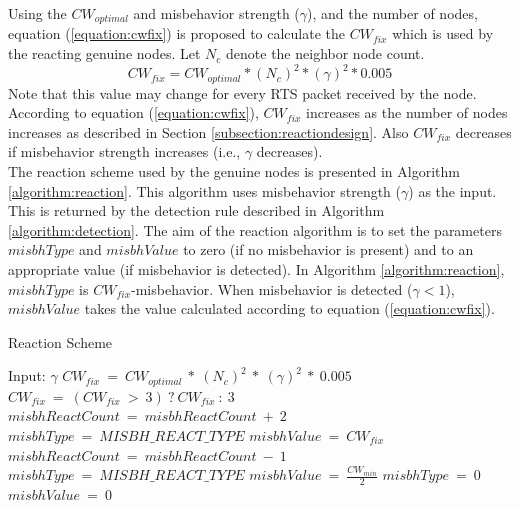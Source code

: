 \documentclass[12pt,letterpaper,english]{article}
\begin{document}
\indent Using the $CW_{optimal}$ and misbehavior strength ($\gamma$), and the number of nodes, equation (\ref{equation:cwfix}) is proposed to calculate the $CW_{fix}$ which is used by the reacting genuine nodes. Let $N_{c}$ denote the neighbor node count.
\begin{equation}
\label{equation:cwfix}
CW_{fix} = CW_{optimal} * (N_{c})^2 * (\gamma)^2 * 0.005
\end{equation}
Note that this value may change for every RTS packet received by the node. According to equation (\ref{equation:cwfix}), $CW_{fix}$ increases as the number of nodes increases as described in Section \ref{subsection:reactiondesign}. Also $CW_{fix}$ decreases if misbehavior strength increases (i.e., $\gamma$ decreases).
\\
\indent The reaction scheme used by the genuine nodes is presented in Algorithm \ref{algorithm:reaction}. This algorithm uses misbehavior strength ($\gamma$) as the input. This is returned by the detection rule described in Algorithm \ref{algorithm:detection}. 
The aim of the reaction algorithm is to set the parameters $misbhType$ and $misbhValue$ to zero (if no misbehavior is present) and to an appropriate value (if misbehavior is detected).
In Algorithm \ref{algorithm:reaction}, $misbhType$ is $CW_{fix}$-misbehavior.
When misbehavior is detected ($\gamma < 1$), $misbhValue$ takes the value calculated according to equation (\ref{equation:cwfix}). 
\begin{algorithm}[t]
\caption{Reaction Scheme}
\label{algorithm:reaction}
\begin{algorithmic}
\STATE Input: $\gamma$
	\STATE $CW_{fix}\ =\ CW_{optimal}\ *\ (N_{c})^2\ *\ (\gamma)^2\ *\ 0.005$
	\STATE $CW_{fix}\ =\ (CW_{fix}\ >\ 3)\ ?\ CW_{fix}\ :\ 3$
	\STATE {}
	\STATE $misbhReactCount\ =\ misbhReactCount\ +\ 2$
	\STATE $misbhType\ =\ MISBH\_REACT\_TYPE$
	\STATE {}
	\STATE $misbhValue\ =\ CW_{fix}$
	\STATE {}
	\STATE $misbhReactCount\ =\ misbhReactCount\ -\ 1$
	\STATE $misbhType\ =\ MISBH\_REACT\_TYPE$
	\STATE $misbhValue\ =\ \frac{CW_{min}}{2}$
\ELSE
	\STATE {}
	\STATE $misbhType\ =\ 0$
	\STATE $misbhValue\ =\ 0$
\ENDIF
\end{algorithmic}
\end{algorithm}
\end{document}
